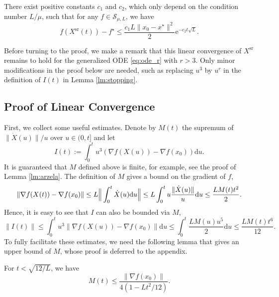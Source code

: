 \documentclass[twoside,11pt]{article}
\newcommand{\e}[1]{\mathrm{e}^{#1}}
\newcommand{\norm}[1]{\|#1\|}
\newcommand{\xsr}{X^{\mathrm{sr}}}
\renewcommand{\d}{{\mathrm{d}}}
\begin{document}
\begin{theorem}\label{exp}
There exist positive constants $c_1$ and $c_2$, which only depend on the condition number $L/\mu$, such that for any $f\in\mathcal{S}_{\mu, L}$, we have
\begin{equation}\nonumber
f(\xsr(t)) - f^\star  \le \frac{c_1L\norm{x_0 - x^\star}^2}{2}\e{-c_2t\sqrt{L}}.
\end{equation}
\end{theorem}

Before turning to the proof, we make a remark that this linear convergence of $\xsr$ remains to hold for the generalized ODE \eqref{eq:ode_r} with $r > 3$. Only minor modifications in the proof below are needed, such as replacing $u^3$ by $u^r$ in the definition of $I(t)$ in Lemma \ref{lm:stopping}.

\subsection{Proof of Linear Convergence}
\label{sec:proof-line-conv}
First, we collect some useful estimates. Denote by $M(t)$ the supremum of $\norm{\dot X(u)}/{u}$ over $u\in (0, t]$ and let
\[ I(t) := \int^t_0 u^3(\nabla f(X(u)) - \nabla f(x_0)) \d u. \]
It is guaranteed that $M$ defined above is finite, for example, see the proof of Lemma \ref{lm:arzela}. The definition of $M$ gives a bound on the gradient of $f$,
\begin{equation}\nonumber
\norm{\nabla f(X(t)) - \nabla f(x_0)} \le  L\Big{\|}\int_{0}^t \dot X(u) \d u \Big{\|}  \le L\int_{0}^t u\frac{\norm{\dot X(u)}}{u} \d u \le \frac{L M(t)t^2}{2}.
\end{equation}
Hence, it is easy to see that $I$ can also be bounded via $M$,
\begin{equation}\nonumber
\|I(t)\| \le \int_0^t u^3\|\nabla f(X(u))-\nabla f(x_0)\|\d u\le \int_0^t \frac{L M(u)u^5}{2}\d u\le \frac{LM(t)t^6}{12}.
\end{equation}
To fully facilitate these estimates, we need the following lemma that gives an upper bound of $M$, whose proof is deferred to the appendix.

\begin{lemma}\label{lm:m_upper}
For $t < \sqrt{12/L}$, we have
\begin{equation}\nonumber
M(t) \le \frac{\norm{\nabla f(x_0)}}{4(1 - Lt^2/12)}.
\end{equation}
\end{lemma}
\end{document}
